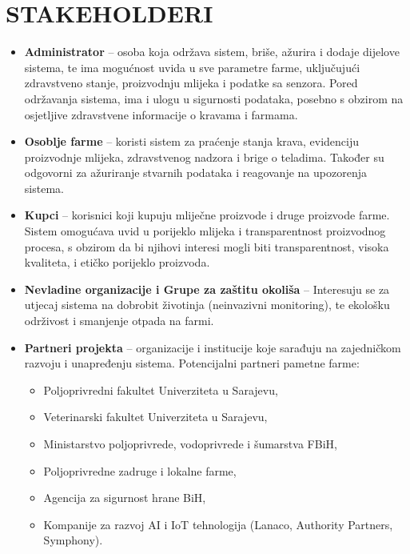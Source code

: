 \documentclass{article}
\begin{document}
\newpage
\section{STAKEHOLDERI}

\begin{itemize}
 \item \textbf{Administrator} – osoba koja održava sistem, briše, ažurira i dodaje dijelove sistema, te ima mogućnost uvida u sve parametre farme, uključujući zdravstveno stanje, proizvodnju mlijeka i podatke sa senzora. Pored održavanja sistema, ima i ulogu u sigurnosti podataka, posebno s obzirom na osjetljive zdravstvene informacije o kravama i farmama.

 \item \textbf{Osoblje farme} – koristi sistem za praćenje stanja krava, evidenciju proizvodnje mlijeka, zdravstvenog nadzora i brige o teladima. Također su odgovorni za ažuriranje stvarnih podataka i reagovanje na upozorenja sistema.

 \item \textbf{Kupci} – korisnici koji kupuju mliječne proizvode i druge proizvode farme. Sistem omogućava uvid u porijeklo mlijeka i transparentnost proizvodnog procesa, s obzirom da bi njihovi interesi mogli biti transparentnost, visoka kvaliteta, i etičko porijeklo proizvoda. 

 \item \textbf{Nevladine organizacije i Grupe za zaštitu okoliša} – Interesuju se za utjecaj sistema na dobrobit životinja (neinvazivni monitoring), te ekološku održivost i smanjenje otpada na farmi.

\item \textbf{Partneri projekta} – organizacije i institucije koje sarađuju na zajedničkom razvoju i unapređenju sistema. Potencijalni partneri pametne farme:
 \begin{itemize}
     \item Poljoprivredni fakultet Univerziteta u Sarajevu,
     \item Veterinarski fakultet Univerziteta u Sarajevu,
     \item Ministarstvo poljoprivrede, vodoprivrede i šumarstva FBiH,
     \item Poljoprivredne zadruge i lokalne farme,
     \item Agencija za sigurnost hrane BiH,
     \item Kompanije za razvoj AI i IoT tehnologija (Lanaco, Authority Partners, Symphony).
\end{itemize}


\end{itemize}
\end{document}
